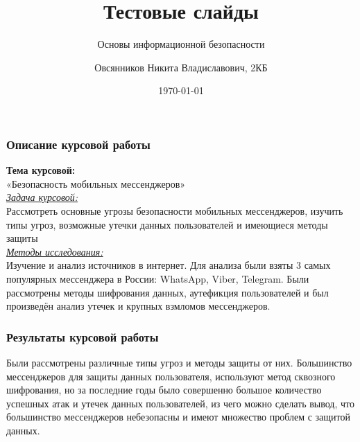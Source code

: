 \documentclass{beamer}
\title{Тестовые слайды}
\subtitle{Основы информационной безопасности}
\author{Овсянников Никита Владиславович, 2КБ}
\date{\today}
\institute{БФУ им. И. Канта}
\begin{document}
\begin{frame}
\titlepage
\end{frame}

\begin{frame}
\frametitle{Описание курсовой работы}
\begin{center}

\textbf{Тема курсовой:}\\
«Безопасность мобильных мессенджеров»\\

\underline{\textit{Задача курсовой:}}\\
Рассмотреть основные угрозы безопасности мобильных мессенджеров, изучить типы угроз, возможные утечки данных пользователей и имеющиеся методы защиты\\

\underline{\textit{Методы исследования:}}\\
Изучение и анализ источников в интернет. Для анализа были взяты 3 самых популярных мессенджера в России: WhatsApp, Viber, Telegram. Были рассмотрены методы шифрования данных, аутефикция пользователей и был произведён анализ утечек и крупных взмломов мессенджеров.

\end{center}
\end{frame}

\begin{frame}
\frametitle{Результаты курсовой работы}
Были рассмотрены различные типы угроз и методы защиты от них. Большинство мессенджеров для защиты данных пользователя, используют метод сквозного шифрования, но за последние годы было совершенно большое количество успешных атак и утечек данных пользователей, из чего можно сделать вывод, что большинство мессенджеров небезопасны и имеют множество проблем с защитой данных.
\end{frame}
\end{document}

